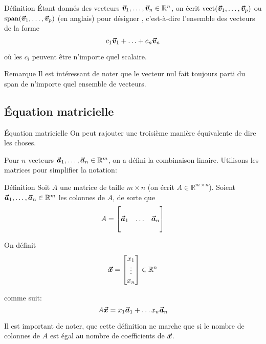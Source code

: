 \documentclass{article}
\begin{document}
\begin{parag}{Définition}
    Étant donnés des vecteurs $\bm{\protect\vec{v}}_1, \ldots, \bm{\protect\vec{v}}_n \in \mathbb{R}^n$, on écrit $\vect\left(\bvec{v}_1, \ldots, \bvec{v}_p\right)$ ou $\Span\left(\bvec{v}_1, \ldots, \bvec{v}_p\right)$ (en anglais) pour désigner , c'est-à-dire l'ensemble des vecteurs de la forme
    \[c_1 \bm{\protect\vec{v}}_1 + \ldots + c_n \bm{\protect\vec{v}}_n\]

    où les $c_i$ peuvent être n'importe quel scalaire.

    \begin{subparag}{Remarque}
        Il est intéressant de noter que le vecteur nul fait toujours parti du span de n'importe quel ensemble de vecteurs.
    \end{subparag}


\end{parag}

\subsection{Équation matricielle}

\begin{parag}{Équation matricielle}
    On peut rajouter une troisième manière équivalente de dire les choses.

    Pour $n$ vecteurs $\bm{\protect\vec{a}}_1, \ldots, \bm{\protect\vec{a}}_n \in \mathbb{R}^m$, on a défini la combinaison linaire. Utilisons les matrices pour simplifier la notation:

    \begin{subparag}{Définition}
        Soit $A$ une matrice de taille $m \times n$ (on écrit $A \in \mathbb{R}^{m \times n}$). Soient $\bm{\protect\vec{a}}_1, \ldots, \bm{\protect\vec{a}}_n \in \mathbb{R}^m$ les colonnes de $A$, de sorte que
        \[A = \begin{bmatrix}  &  &  \\ \bm{\protect\vec{a}}_1 & \ldots & \bm{\protect\vec{a}}_n \\  &  &  \end{bmatrix} \]

        On définit 
        \[\bm{\protect\vec{x}} = \begin{bmatrix} x_1 \\ \vdots \\ x_n \end{bmatrix} \in \mathbb{R}^n\]

        comme suit:
        \[A \bm{\protect\vec{x}} = x_1 \bm{\protect\vec{a}}_1 + \ldots x_n \bm{\protect\vec{a}}_n\]

        Il est important de noter, que cette définition ne marche que si le nombre de colonnes de $A$ est égal au nombre de coefficients de $\bm{\protect\vec{x}}$.
    \end{subparag}

\end{parag}
\end{document}
